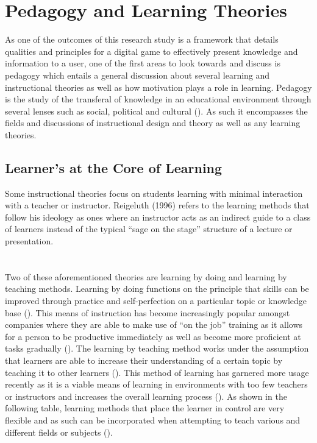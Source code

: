 \section{Pedagogy and Learning Theories}
As one of the outcomes of this research study is a framework that details qualities and principles for a digital game to effectively present knowledge and information to a user, one of the first areas to look towards and discuss is pedagogy which entails a general discussion about several learning and instructional theories as well as how motivation plays a role in learning. Pedagogy is the study of the transferal of knowledge in an educational environment through several lenses such as social, political and cultural (\cite{Li2012}). As such it encompasses the fields and discussions of instructional design and theory as well as any learning theories.

\subsection{Learner's at the Core of Learning}
Some instructional theories focus on students learning with minimal interaction with a teacher or instructor. Reigeluth (1996) refers to the learning methods that follow his ideology as ones where an instructor acts as an indirect guide to a class of learners instead of the typical “sage on the stage” structure of a lecture or presentation. 
\\\\\\
Two of these aforementioned theories are learning by doing and learning by teaching methods. Learning by doing functions on the principle that skills can be improved through practice and self-perfection on a particular topic or knowledge base (\cite{Fisch2009}). This means of instruction has become increasingly popular amongst companies where they are able to make use of “on the job” training as it allows for a person to be productive immediately as well as become more proficient at tasks gradually (\cite{Fisch2009}). The learning by teaching method works under the assumption that learners are able to increase their understanding of a certain topic by teaching it to other learners (\cite{Fisch2009}). This method of learning has garnered more usage recently as it is a viable means of learning in environments with too few teachers or instructors and increases the overall learning process (\cite{Fisch2009}). As shown in the following table, learning methods that place the learner in control are very flexible and as such can be incorporated when attempting to teach various and different fields or subjects (\cite{Ackoff1991}).

